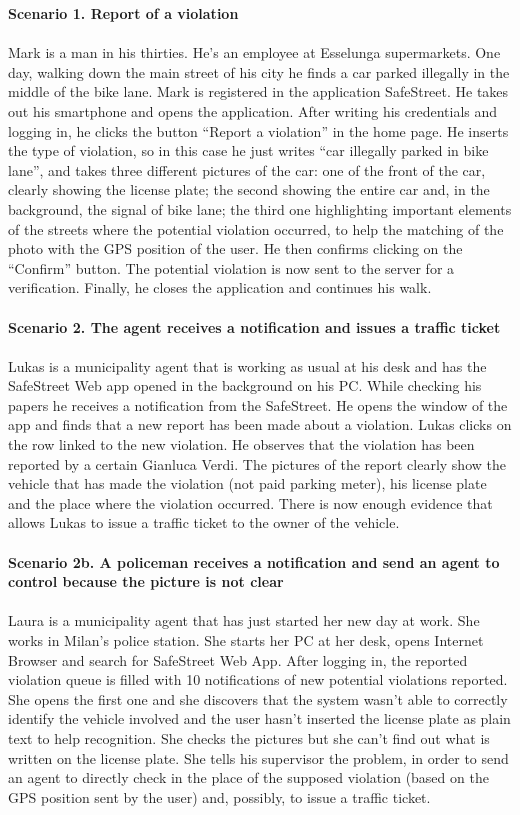 \documentclass[a4paper]{report}
\begin{document}
\textbf{Scenario 1. Report of a violation}\\
\\
Mark is a man in his thirties. He’s an employee at Esselunga supermarkets. One day, walking down the main street of his city he finds a car parked illegally in the middle of the bike lane. Mark is registered in the application SafeStreet. He takes out his smartphone and opens the application. After writing his credentials and logging in, he clicks the button “Report a violation” in the home page. He inserts the type of violation, so in this case he just writes “car illegally parked in bike lane”, and takes three different pictures of the car: one of the front of the car, clearly showing the license plate; the second showing the entire car and, in the background, the signal of bike lane; the third one highlighting important elements of the streets where the potential violation occurred, to help the matching of the photo with the GPS position of the user. He then confirms clicking on the “Confirm” button. The potential violation is now sent to the server for a verification. Finally, he closes the application and continues his walk.
\\
\\ 
\textbf{Scenario 2. The agent receives a notification and issues a traffic ticket}\\
\\
Lukas is a municipality agent that is working as usual at his desk and has the SafeStreet Web app opened in the background on his PC. While checking his papers he receives a notification from the SafeStreet. He opens the window of the app and finds that a new report has been made about a violation. Lukas clicks on the row linked to the new violation. He observes that the violation has been reported by a certain Gianluca Verdi. The pictures of the report clearly show the vehicle that has made the violation (not paid parking meter), his license plate and the place where the violation occurred. There is now enough evidence that allows Lukas to issue a traffic ticket to the owner of the vehicle.
\\
\\
\textbf{Scenario 2b. A policeman receives a notification and send an agent to control because the picture is not clear}\\
\\
Laura is a municipality agent that has just started her new day at work. She works in Milan’s police station. She starts her PC at her desk, opens Internet Browser and search for SafeStreet Web App. After logging in, the reported violation queue is filled with 10 notifications of new potential violations reported. She opens the first one and she discovers that the system wasn’t able to correctly identify the vehicle involved and the user hasn’t inserted the license plate as plain text to help recognition. She checks the pictures but she can’t find out what is written on the license plate. She tells his supervisor the problem, in order to send an agent to directly check in the place of the supposed violation (based on the GPS position sent by the user) and, possibly, to issue a traffic ticket.
\end{document}
